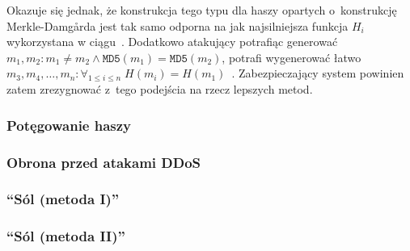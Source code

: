 Okazuje się jednak, że konstrukcja tego typu dla haszy opartych o~konstrukcję
Merkle-Damg\r{a}rda jest tak samo odporna na  jak
najsilniejsza funkcja $H_i$ wykorzystana w ciągu~\cite{md5_concatenation}.
Dodatkowo atakujący potrafiąc generować $m_1, m_2 : m_1 \neq m_2 \wedge
\mathtt{MD5}(m_1) = \mathtt{MD5}(m_2)$, potrafi wygenerować łatwo $m_3, m_4,
\ldots, m_n : \forall_{1 \leq i \leq n} \; H(m_i) =
H(m_1)$~\cite{md5_multi_collision_attack}. Zabezpieczający system powinien
zatem zrezygnować z~tego podejścia na rzecz lepszych metod.

\subsubsection{Potęgowanie haszy}

\subsubsection{Obrona przed atakami DDoS}

\subsubsection{``Sól (metoda I)''}

\subsubsection{``Sól (metoda II)''}
